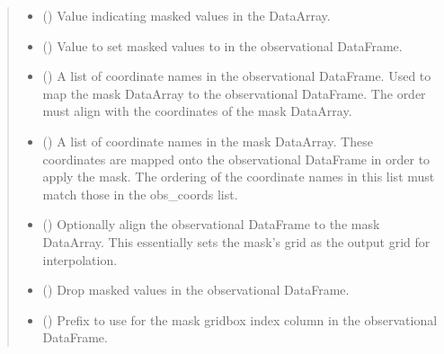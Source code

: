 \documentclass[letterpaper,10pt,english]{sphinxmanual}
\begin{document}
\begin{fulllineitems}
\begin{quote}
\begin{description}
\begin{itemize}
\item {}
\sphinxAtStartPar
{} () \textendash{} Value indicating masked values in the DataArray.

\item {}
\sphinxAtStartPar
{} () \textendash{} Value to set masked values to in the observational DataFrame.

\item {}
\sphinxAtStartPar
{} () \textendash{} A list of coordinate names in the observational DataFrame. Used to map
the mask DataArray to the observational DataFrame. The order must align
with the coordinates of the mask DataArray.

\item {}
\sphinxAtStartPar
{} () \textendash{} A list of coordinate names in the mask DataArray. These coordinates are
mapped onto the observational DataFrame in order to apply the mask. The
ordering of the coordinate names in this list must match those in the
obs\_coords list.

\item {}
\sphinxAtStartPar
{} () \textendash{} Optionally align the observational DataFrame to the mask DataArray.
This essentially sets the mask’s grid as the output grid for
interpolation.

\item {}
\sphinxAtStartPar
{} () \textendash{} Drop masked values in the observational DataFrame.

\item {}
\sphinxAtStartPar
{} () \textendash{} Prefix to use for the mask gridbox index column in the observational
DataFrame.


\end{itemize}
\end{description}
\end{quote}
\end{fulllineitems}
\end{document}
